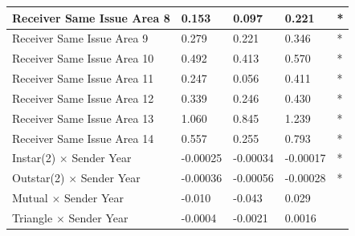 \documentclass[headsepline=true, abstracton]{scrartcl}
\begin{document}
\begin{table}[H]
\begin{tabular}{|
>{\columncolor[HTML]{EFEFEF}}l |l|l|l|l|}
Receiver Same Issue Area 8                         & 0.153                            & 0.097                               & 0.221                               & *                                    \\ \hline
Receiver Same Issue Area 9                         & 0.279                            & 0.221                               & 0.346                               & *                                    \\ \hline
Receiver Same Issue Area 10                        & 0.492                            & 0.413                               & 0.570                               & *                                    \\ \hline
Receiver Same Issue Area 11                        & 0.247                            & 0.056                               & 0.411                               & *                                    \\ \hline
Receiver Same Issue Area 12                        & 0.339                            & 0.246                               & 0.430                               & *                                    \\ \hline
Receiver Same Issue Area 13                        & 1.060                            & 0.845                               & 1.239                               & *                                    \\ \hline
Receiver Same Issue Area 14                        & 0.557                            & 0.255                               & 0.793                               & *                                    \\ \hline
Instar(2) $\times$ Sender Year                     & -0.00025                         & -0.00034                            & -0.00017                            & *                                    \\ \hline
Outstar(2) $\times$ Sender Year                    & -0.00036                         & -0.00056                            & -0.00028                            & *                                    \\ \hline
Mutual $\times$ Sender Year                        & -0.010                           & -0.043                              & 0.029                               &                                      \\ \hline
Triangle $\times$ Sender Year                      & -0.0004                          & -0.0021                             & 0.0016                              &                                      \\ \hline

\end{tabular}
\end{table}
\end{document}
